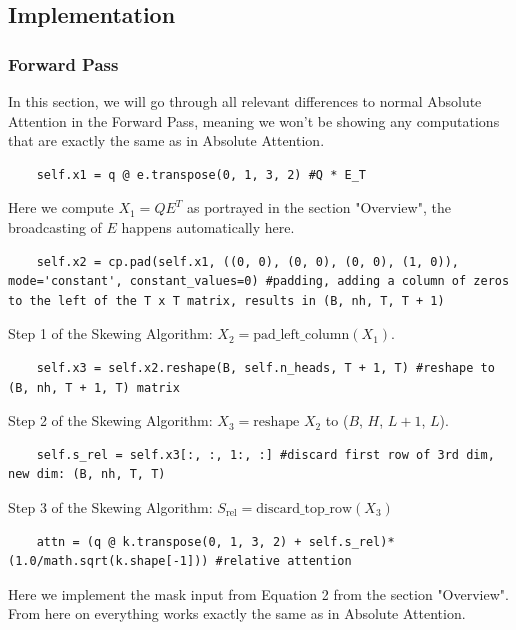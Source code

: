 \documentclass[a4paper,12pt]{extarticle}
\begin{document}
\subsection{Implementation}
\subsubsection{Forward Pass}
In this section, we will go through all relevant differences to normal Absolute Attention in the Forward Pass, meaning we won't be showing any computations that are exactly the same as in Absolute Attention.\newline
\begin{lstlisting}
    self.x1 = q @ e.transpose(0, 1, 3, 2) #Q * E_T
\end{lstlisting}
Here we compute $X_1 = QE^T$ as portrayed in the section "Overview", the broadcasting of $E$ happens automatically here.\newline
\begin{lstlisting}
    self.x2 = cp.pad(self.x1, ((0, 0), (0, 0), (0, 0), (1, 0)), mode='constant', constant_values=0) #padding, adding a column of zeros to the left of the T x T matrix, results in (B, nh, T, T + 1)
\end{lstlisting}
Step 1 of the Skewing Algorithm: \( X_2 = \text{pad\_left\_column}(X_1) \).\newline

\begin{lstlisting}
    self.x3 = self.x2.reshape(B, self.n_heads, T + 1, T) #reshape to (B, nh, T + 1, T) matrix
\end{lstlisting}
Step 2 of the Skewing Algorithm: \( X_3 = \text{reshape } X_2\) to ($B$, $H$, $L + 1$, $L$). \newline

\begin{lstlisting}
    self.s_rel = self.x3[:, :, 1:, :] #discard first row of 3rd dim, new dim: (B, nh, T, T)
\end{lstlisting}
Step 3 of the Skewing Algorithm: \( S_\text{rel} = \text{discard\_top\_row}(X_3)\)\newline

\begin{lstlisting}
    attn = (q @ k.transpose(0, 1, 3, 2) + self.s_rel)*(1.0/math.sqrt(k.shape[-1])) #relative attention
\end{lstlisting}
Here we implement the mask input from Equation 2 from the section "Overview". From here on everything works exactly the same as in Absolute Attention.
\end{document}
